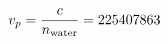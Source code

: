 \documentclass[preview]{standalone}
\begin{document}
\begin{align*}
\special{dvisvgm:raw <g id='unique000'>}v_p = \frac{c}{n_{\text{water}}} = 225407863\special{dvisvgm:raw </g>}
\end{align*}
\end{document}
